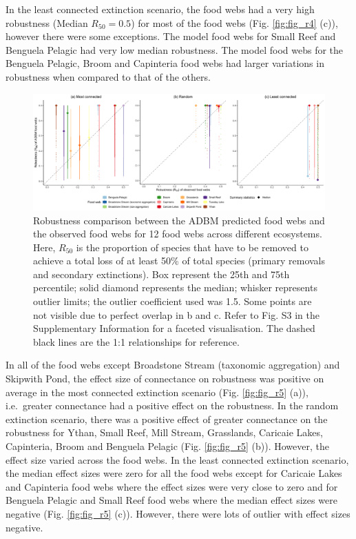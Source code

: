 \documentclass{article}
\begin{document}
In the least connected extinction scenario, the food webs had a very
high robustness (Median \(R_{50} = 0.5\)) for most of the food webs
(Fig. \ref{fig:fig_r4} (c)), however there were some exceptions. The
model food webs for Small Reef and Benguela Pelagic had very low median
robustness. The model food webs for the Benguela Pelagic, Broom and
Capinteria food webs had larger variations in robustness when compared
to that of the others.

\begin{figure}

{\centering \includegraphics[width=450px]{../results/plot_R50_ADBM_vs_obs} 

}

\caption{\label{fig:fig_r4} Robustness comparison between the ADBM predicted food webs and the observed food webs for 12 food webs across different ecosystems. Here, $R_{50}$ is the proportion of species that have to be removed to achieve a total loss of at least 50\% of total species (primary removals and secondary extinctions). Box represent the 25th and 75th percentile; solid diamond represents the median; whisker represents outlier limits; the outlier coefficient used was 1.5. Some points are not visible due to perfect overlap in b and c. Refer to Fig. S3 in the Supplementary Information for a faceted visualisation. The dashed black lines are the 1:1 relationships for reference.}\label{fig:unnamed-chunk-2}
\end{figure}

In all of the food webs except Broadstone Stream (taxonomic aggregation)
and Skipwith Pond, the effect size of connectance on robustness was
positive on average in the most connected extinction scenario (Fig.
\ref{fig:fig_r5} (a)), i.e.~greater connectance had a positive effect on
the robustness. In the random extinction scenario, there was a positive
effect of greater connectance on the robustness for Ythan, Small Reef,
Mill Stream, Grasslands, Caricaie Lakes, Capinteria, Broom and Benguela
Pelagic (Fig. \ref{fig:fig_r5} (b)). However, the effect size varied
across the food webs. In the least connected extinction scenario, the
median effect sizes were zero for all the food webs except for Caricaie
Lakes and Capinteria food webs where the effect sizes were very close to
zero and for Benguela Pelagic and Small Reef food webs where the median
effect sizes were negative (Fig. \ref{fig:fig_r5} (c)). However, there
were lots of outlier with effect sizes negative.
\end{document}
